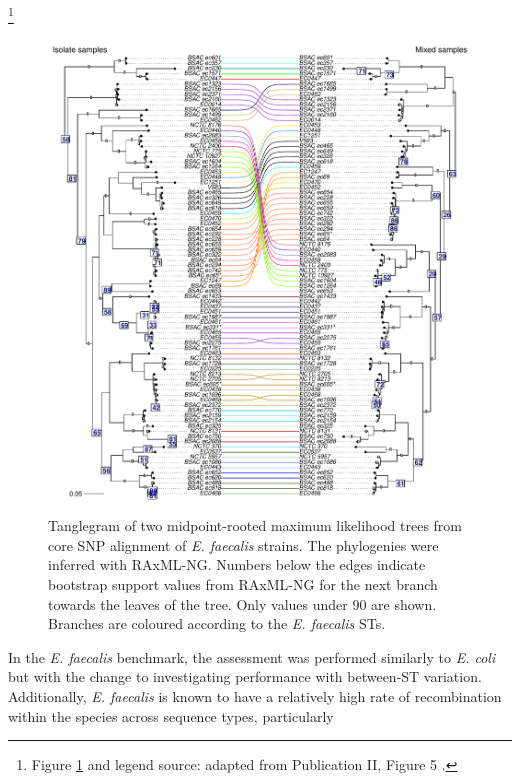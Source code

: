 \documentclass[officiallayout]{tktla}
\let\svthefootnote\thefootnote
\begin{document}
\noindent\let\thefootnote\relax\footnote{Figure \ref{fig:mgems-efaecalis-phylogeny} and legend source: adapted from Publication II, Figure 5 \citep{maklin_bacterial_2021}.}
\addtocounter{footnote}{-1}\let\thefootnote\svthefootnote
\begin{figure}[!h]
    \centering
    \includegraphics[height=0.75\textheight,width=\textwidth,keepaspectratio]{img/reproduced/MGen2021_mGEMS_Figure_5.pdf}
    \caption{Tanglegram of two midpoint-rooted maximum likelihood
      trees from core SNP alignment of \textit{E. faecalis}
      strains. The phylogenies were inferred with RAxML-NG. Numbers
      below the edges indicate bootstrap support values from RAxML-NG
      for the next branch towards the leaves of the tree. Only values under 90 are shown. Branches are
      coloured according to the \textit{E. faecalis} STs.}
    \label{fig:mgems-efaecalis-phylogeny}
\end{figure}
In the \textit{E. faecalis} benchmark, the assessment was performed
similarly to \textit{E. coli} but with the change to investigating
performance with between-ST variation. Additionally,
\textit{E. faecalis} is known to have a relatively high rate of
recombination within the species across sequence types, particularly
\end{document}
